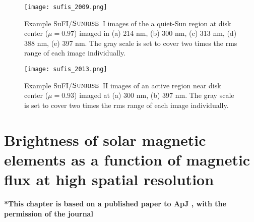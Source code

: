 \documentclass[goettingen, gauss, print]{thesis}
\begin{document}
\begin{figure}[h]
\centering
\hspace*{-2cm}\texttt{[image: sufis\_2009.png]}
\caption{Example SuFI/$\textsc{Sunrise}$~I images of the a quiet-Sun region at disk center ($\mu=0.97$) imaged in (a) 214 nm, (b) 300 nm, (c) 313 nm, (d) 388 nm, (e) 397 nm. The gray scale is set to cover two times the rms range of each image individually. }
\label{sufis_2009}
\end{figure} 


\begin{figure}[h]
\centering
\texttt{[image: sufis\_2013.png]}
\caption{Example SuFI/$\textsc{Sunrise}$~II images of an active region near disk center ($\mu = 0.93$) imaged at (a) 300 nm, (b) 397 nm. The gray scale is set to cover two times the rms range of each image individually. }
\label{sufis_2013}
\end{figure} 



\newpage




\chapter{Brightness of solar magnetic elements as a function of magnetic flux at high spatial resolution}
\label{chapter_3}
\textbf{*This chapter is based on a published paper to ApJ \citep{kahil_brightness_2017}, with the permission of the journal} \\ \\
\end{document}
